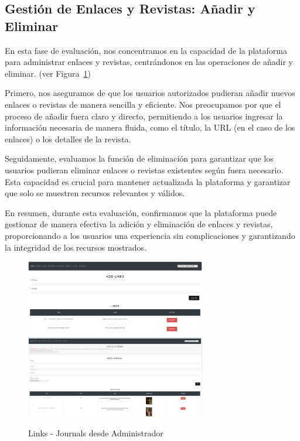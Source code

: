 \documentclass[a4paper, 12pt]{book}
\begin{document}
\subsection{Gestión de Enlaces y Revistas: Añadir y Eliminar}
\label{sec:add-delete-links-magazines}

En esta fase de evaluación, nos concentramos en la capacidad de la plataforma para administrar enlaces y revistas, centrándonos en las operaciones de 
añadir y eliminar. (ver Figura~\ref{fig:journadmin})

Primero, nos aseguramos de que los usuarios autorizados pudieran añadir nuevos enlaces o revistas de manera sencilla y eficiente. Nos preocupamos por 
que el proceso de añadir fuera claro y directo, permitiendo a los usuarios ingresar la información necesaria de manera fluida, como el título, la URL 
(en el caso de los enlaces) o los detalles de la revista.

Seguidamente, evaluamos la función de eliminación para garantizar que los usuarios pudieran eliminar enlaces o revistas existentes según fuera necesario. 
Esta capacidad es crucial para mantener actualizada la plataforma y garantizar que solo se muestren recursos relevantes y válidos.

En resumen, durante esta evaluación, confirmamos que la plataforma puede gestionar de manera efectiva la adición y eliminación de enlaces y revistas, 
proporcionando a los usuarios una experiencia sin complicaciones y garantizando la integridad de los recursos mostrados.

\begin{figure}
  \centering
  \includegraphics[width=0.7\textwidth]{img/linksadmin.png}
  \includegraphics[width=0.7\textwidth]{img/linksadmin1.png}
  \caption{Links - Journals desde Administrador}
  \label{fig:journadmin}
\end{figure}
\end{document}
